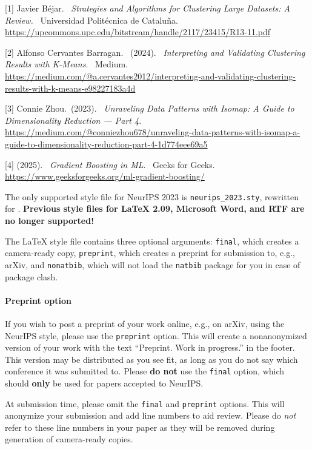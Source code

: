 \documentclass{article}
\begin{document}
{
\small


[1] Javier Béjar. \ \textit{Strategies and Algorithms for Clustering Large Datasets: A
Review.} \ Universidad Politécnica de Cataluña.
\url{https://upcommons.upc.edu/bitstream/handle/2117/23415/R13-11.pdf}


[2] Alfonso Cervantes Barragan. \ (2024). \ \textit{Interpreting and Validating Clustering Results with K-Means}. 
\ Medium. 
\url{https://medium.com/@a.cervantes2012/interpreting-and-validating-clustering-results-with-k-means-e98227183a4d}


[3] Connie Zhou.\ (2023). \ \textit{Unraveling Data Patterns with Isomap: A Guide to Dimensionality Reduction — Part 4}.
\url{https://medium.com/@conniezhou678/unraveling-data-patterns-with-isomap-a-guide-to-dimensionality-reduction-part-4-1d774eee69a5}

[4] (2025). \ \textit{Gradient Boosting in ML}. \ Geeks for Geeks.
\url{https://www.geeksforgeeks.org/ml-gradient-boosting/}

}






The only supported style file for NeurIPS 2023 is \verb+neurips_2023.sty+,
rewritten for \LaTeXe{}.  \textbf{Previous style files for \LaTeX{} 2.09,
  Microsoft Word, and RTF are no longer supported!}


The \LaTeX{} style file contains three optional arguments: \verb+final+, which
creates a camera-ready copy, \verb+preprint+, which creates a preprint for
submission to, e.g., arXiv, and \verb+nonatbib+, which will not load the
\verb+natbib+ package for you in case of package clash.


\paragraph{Preprint option}
If you wish to post a preprint of your work online, e.g., on arXiv, using the
NeurIPS style, please use the \verb+preprint+ option. This will create a
nonanonymized version of your work with the text ``Preprint. Work in progress.''
in the footer. This version may be distributed as you see fit, as long as you do not say which conference it was submitted to. Please \textbf{do
  not} use the \verb+final+ option, which should \textbf{only} be used for
papers accepted to NeurIPS. 


At submission time, please omit the \verb+final+ and \verb+preprint+
options. This will anonymize your submission and add line numbers to aid
review. Please do \emph{not} refer to these line numbers in your paper as they
will be removed during generation of camera-ready copies.
\end{document}

